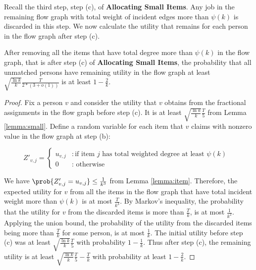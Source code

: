 Recall the third step, step (c), of {\bf Allocating Small Items}. Any job in the remaining flow graph with total weight of
incident edges more than $\psi(k)$ is discarded in this step. We now calculate the utility that remains for
each person in the flow graph after step (c).

\begin{lemma}
\label{lemma:stepc}
After removing all the items that have total degree more than $\psi(k)$ in the flow graph, that is after step (c)
of {\bf Allocating Small Items}, the probability that all unmatched persons have remaining utility in the flow graph at least $\sqrt{\frac{\ln{k}}{k}}\frac{T}{2*(3+o(1))}$ is at least $1-\frac{2}{k}$.
\end{lemma}
\begin{proof}
Fix a person $v$ and consider the utility that $v$ obtains from the fractional assignments in the flow graph before step (c). It is at least $\sqrt{\frac{\ln{k}}{k}}\frac{T}{5}$ from Lemma \ref{lemma:small}.
Define a random variable for each item that $v$ claims with nonzero value in the flow graph at step (b):

\begin{equation}
\label{eqn:newdef}
Z'_{v,j} = \begin{cases} u_{v,j} &: \text{if item $j$ has total weighted degree at least $\psi(k)$ } \\
0 &: \text{ otherwise} \end{cases}
\end{equation}

We have $\prob{Z'_{v,j}=u_{v,j}} \leq \frac{1}{k^3}$ from Lemma \ref{lemma:item}.
Therefore, the expected utility for $v$ from all the items in the flow graph that have total incident weight
more than  $\psi(k)$  is at most $\frac{T}{k^3}$. By Markov's
inequality, the probability that the utility for $v$ from the discarded items is more than $\frac{T}{k}$, is at most $\frac{1}{k^2}$. Applying
the union bound, the probability of the utility from the discarded items being more than $\frac{T}{k}$ for some person,
is at most $\frac{1}{k}$. The initial utility before step (c) was at least $\sqrt{\frac{\ln{k}}{k}}\frac{T}{5}$ with probability $1-\frac{1}{k}$.
Thus after step (c), the remaining utility is at least $\sqrt{\frac{\ln{k}}{k}}\frac{T}{5}-\frac{T}{k}$ with probability at least $1-\frac{2}{k}$.
\end{proof}

